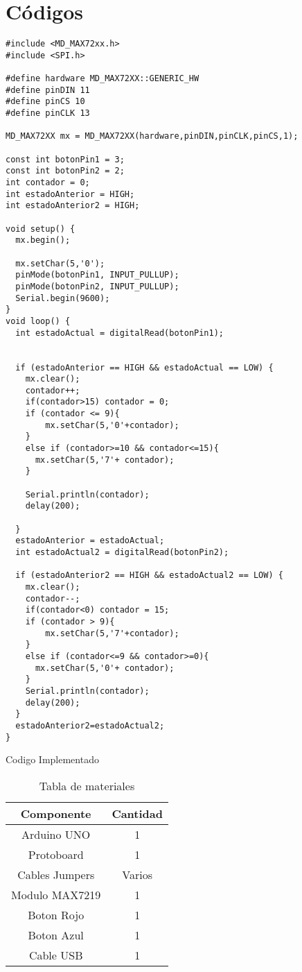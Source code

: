 \section{Códigos}

\begin{listing}[H]
  \scriptsize
  \begin{verbatim}
#include <MD_MAX72xx.h>
#include <SPI.h>

#define hardware MD_MAX72XX::GENERIC_HW
#define pinDIN 11
#define pinCS 10
#define pinCLK 13

MD_MAX72XX mx = MD_MAX72XX(hardware,pinDIN,pinCLK,pinCS,1);

const int botonPin1 = 3;  
const int botonPin2 = 2;
int contador = 0;         
int estadoAnterior = HIGH; 
int estadoAnterior2 = HIGH;

void setup() {
  mx.begin();
  
  mx.setChar(5,'0');
  pinMode(botonPin1, INPUT_PULLUP); 
  pinMode(botonPin2, INPUT_PULLUP);
  Serial.begin(9600);
}
void loop() {
  int estadoActual = digitalRead(botonPin1);
  

  if (estadoAnterior == HIGH && estadoActual == LOW) {
    mx.clear();
    contador++;
    if(contador>15) contador = 0;
    if (contador <= 9){
        mx.setChar(5,'0'+contador);
    }
    else if (contador>=10 && contador<=15){
      mx.setChar(5,'7'+ contador);
    }
    
    Serial.println(contador);
    delay(200); 
    
  }
  estadoAnterior = estadoActual; 
  int estadoActual2 = digitalRead(botonPin2);
 
  if (estadoAnterior2 == HIGH && estadoActual2 == LOW) {
    mx.clear();
    contador--;
    if(contador<0) contador = 15;
    if (contador > 9){
        mx.setChar(5,'7'+contador);
    }
    else if (contador<=9 && contador>=0){
      mx.setChar(5,'0'+ contador);
    }
    Serial.println(contador);
    delay(200); 
  }
  estadoAnterior2=estadoActual2;
}
  \end{verbatim}
  \caption{Codigo Implementado}
  \label{lst:cod-1}
\end{listing}
\clearpage 
\begin{table}
  \centering
  \begin{tabular}{||c|c||}
    \hline
    Componente & Cantidad \\ \hline \hline
    Arduino UNO & 1 \\ 
    Protoboard & 1 \\ 
    Cables Jumpers & Varios \\ 
    Modulo MAX7219 & 1 \\ 
    Boton Rojo & 1 \\ 
    Boton Azul & 1 \\ 
    Cable USB & 1 \\ \hline
  \end{tabular}
  \caption{Tabla de materiales}
  \label{tab:materiales}
\end{table}
